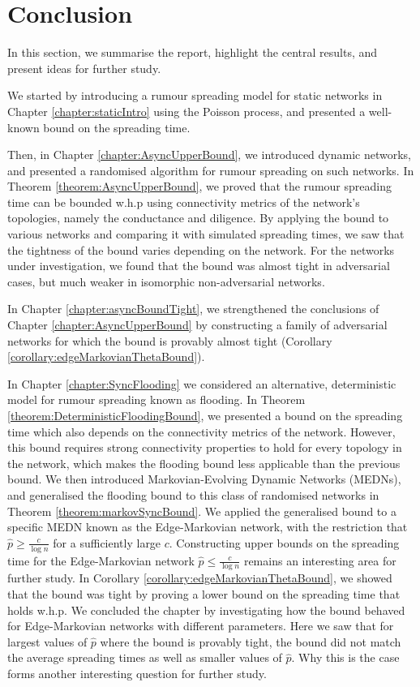 \chapter{Conclusion}

In this section, we summarise the report, highlight the central results, and present ideas for further study.

We started by introducing a rumour spreading model for static networks in Chapter \ref{chapter:staticIntro} using the Poisson process, and presented a well-known bound on the spreading time. 

Then, in Chapter \ref{chapter:AsyncUpperBound}, we introduced dynamic networks, and presented a randomised algorithm for rumour spreading on such networks. In Theorem \ref{theorem:AsyncUpperBound}, we proved that the rumour spreading time can be bounded w.h.p using connectivity metrics of the network's topologies, namely the conductance and diligence. By applying the bound to various networks and comparing it with simulated spreading times, we saw that the tightness of the bound varies depending on the network. For the networks under investigation, we found that the bound was almost tight in adversarial cases, but much weaker in isomorphic non-adversarial networks. 

In Chapter \ref{chapter:asyncBoundTight}, we strengthened the conclusions of Chapter \ref{chapter:AsyncUpperBound} by constructing a family of adversarial networks for which the bound is provably almost tight (Corollary \ref{corollary:edgeMarkovianThetaBound}).

In Chapter \ref{chapter:SyncFlooding} we considered an alternative, deterministic model for rumour spreading known as flooding. In Theorem \ref{theorem:DeterministicFloodingBound}, we presented a bound on the spreading time which also depends on the connectivity metrics of the network. 
However, this bound requires strong connectivity properties to hold for every topology in the network, which makes the flooding bound less applicable than the previous bound. %
We then introduced Markovian-Evolving Dynamic Networks (MEDNs), and generalised the flooding bound to this class of randomised networks in Theorem \ref{theorem:markovSyncBound}. We applied the generalised bound to a specific MEDN known as the Edge-Markovian network, with the restriction that $\hat{p} \geq \frac{c}{\log n}$ for a sufficiently large $c$. Constructing upper bounds on the spreading time for the Edge-Markovian network $\hat{p} \leq \frac{c}{\log n}$ remains an interesting area for further study. In Corollary \ref{corollary:edgeMarkovianThetaBound}, we showed that the bound was tight by proving a lower bound on the spreading time that holds w.h.p. We concluded the chapter by investigating how the bound behaved for Edge-Markovian networks with different parameters. Here we saw that for largest values of $\hat{p}$ where the bound is provably tight, the bound did not match the average spreading times as well as smaller values of $\hat{p}$. Why this is the case forms another interesting question for further study.

